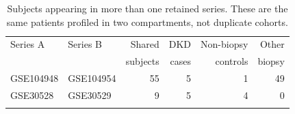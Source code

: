 \begin{table}[h]
\caption{Subjects appearing in more than one retained series. These are the same patients profiled in two compartments, not duplicate cohorts.}\label{tab:overlap}
\begin{tabular}{@{}llrrrr@{}}
\toprule
Series A & Series B & Shared & DKD & Non-biopsy & Other \\
        &          & subjects & cases & controls & biopsy \\
\midrule
GSE104948 & GSE104954 & 55 & 5 & 1 & 49 \\
GSE30528 & GSE30529 & 9 & 5 & 4 & 0 \\
\botrule
\end{tabular}
\end{table}
